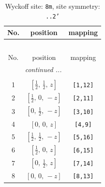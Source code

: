 \documentclass[fleqn,8pt]{jsarticle}
\begin{document}
\renewcommand{\arraystretch}{1.2}
\begin{longtable}{ccc}
\caption{Wyckoff site: {\tt 8m}, site symmetry: {\tt ..2'}}
 \\
 \hline \hline
No. & position & mapping \\ \hline \endfirsthead

\multicolumn{2}{l}{\tablename\ \thetable{}} \\
 \hline \hline
No. & position & mapping \\ \hline \endhead

 \hline \hline
\multicolumn{2}{r}{\footnotesize\it continued ...} \\ \endfoot

 \hline \hline
\multicolumn{2}{r}{} \\ \endlastfoot

1 & $\left[ \frac{1}{2},\, \frac{1}{2},\, z \right]$ & {\tt [1,12]} \\ \hline
2 & $\left[ \frac{1}{2},\, 0,\, - z \right]$ & {\tt [2,11]} \\ \hline
3 & $\left[ 0,\, \frac{1}{2},\, - z \right]$ & {\tt [3,10]} \\ \hline
4 & $\left[ 0,\, 0,\, z \right]$ & {\tt [4,9]} \\ \hline
5 & $\left[ \frac{1}{2},\, \frac{1}{2},\, - z \right]$ & {\tt [5,16]} \\ \hline
6 & $\left[ \frac{1}{2},\, 0,\, z \right]$ & {\tt [6,15]} \\ \hline
7 & $\left[ 0,\, \frac{1}{2},\, z \right]$ & {\tt [7,14]} \\ \hline
8 & $\left[ 0,\, 0,\, - z \right]$ & {\tt [8,13]} \\
\end{longtable}
\renewcommand{\arraystretch}{1.2}
\end{document}
